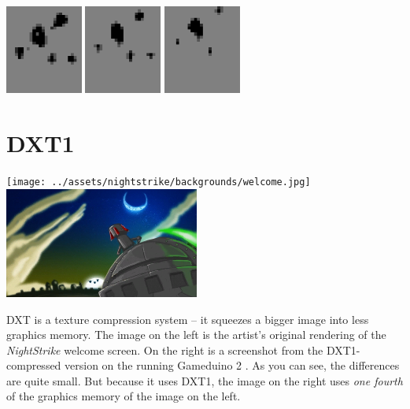 \documentclass[10pt]{book}
\newcommand{\gdtwo}{Gameduino 2 }
\begin{document}
\begin{center}
\includegraphics[width=0.19\textwidth]{previews/nightstrike_1-FIRE-12.png}
\includegraphics[width=0.19\textwidth]{previews/nightstrike_1-FIRE-13.png}
\includegraphics[width=0.19\textwidth]{previews/nightstrike_1-FIRE-14.png}
\end{center}
\clearpage

\newpage
\section{DXT1}
\label{dxt1}

\begin{center}
\texttt{[image: ../assets/nightstrike/backgrounds/welcome.jpg]}
\includegraphics[width=0.48\textwidth]{dxt1.png}
\end{center}

DXT is a texture compression system -- it squeezes a bigger image into less graphics memory.
The image on the left is the artist's original rendering of the \textit{NightStrike} welcome screen. On the right is a screenshot
from the DXT1-compressed version on the running \gdtwo. As you can see, the differences are quite small.
But because it uses DXT1,
the image on the right uses \textit{one fourth} of the graphics memory of the image on the left.
\end{document}
